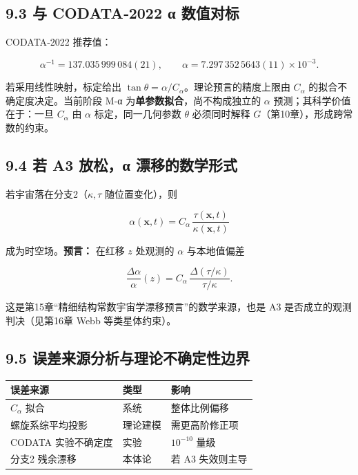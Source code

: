 \subsection{9.3 与 CODATA‑2022 α
数值对标}\label{ux4e0e-codata2022-ux3b1-ux6570ux503cux5bf9ux6807}

CODATA‑2022 推荐值：

\[
\alpha^{-1}=137.035\,999\,084(21),\qquad \alpha=7.297\,352\,5643(11)\times10^{-3}.
\]

若采用线性映射，标定给出
\(\tan\theta=\alpha/C_\alpha\)。理论预言的精度上限由 \(C_\alpha\)
的拟合不确定度决定。当前阶段 M‑α 为\textbf{单参数拟合}，尚不构成独立的
\(\alpha\) 预测；其科学价值在于：一旦 \(C_\alpha\) 由 \(\alpha\)
标定，同一几何参数 \(\theta\) 必须同时解释
\(G\)（第10章），形成跨常数的约束。

\subsection{9.4 若 A3 放松，α
漂移的数学形式}\label{ux82e5-a3-ux653eux677eux3b1-ux6f02ux79fbux7684ux6570ux5b66ux5f62ux5f0f}

若宇宙落在分支2（\(\kappa,\tau\) 随位置变化），则

\[
\alpha(\mathbf{x},t)=C_\alpha\,\frac{\tau(\mathbf{x},t)}{\kappa(\mathbf{x},t)}
\]

成为时空场。\textbf{预言：} 在红移 \(z\) 处观测的 \(\alpha\)
与本地值偏差

\[
\frac{\Delta\alpha}{\alpha}(z)=C_\alpha\,\frac{\Delta(\tau/\kappa)}{\tau/\kappa}.
\]

这是第15章``精细结构常数宇宙学漂移预言''的数学来源，也是 A3
是否成立的观测判决（见第16章 Webb 等类星体约束）。

\subsection{9.5
误差来源分析与理论不确定性边界}\label{ux8befux5deeux6765ux6e90ux5206ux6790ux4e0eux7406ux8bbaux4e0dux786eux5b9aux6027ux8fb9ux754c}

\begin{longtable}[]{@{}lll@{}}
\toprule\noalign{}
误差来源 & 类型 & 影响 \\
\midrule\noalign{}
\endhead
\bottomrule\noalign{}
\endlastfoot
\(C_\alpha\) 拟合 & 系统 & 整体比例偏移 \\
螺旋系综平均投影 & 理论建模 & 需更高阶修正项 \\
CODATA 实验不确定度 & 实验 & \(10^{-10}\) 量级 \\
分支2 残余漂移 & 本体论 & 若 A3 失效则主导 \\
\end{longtable}

